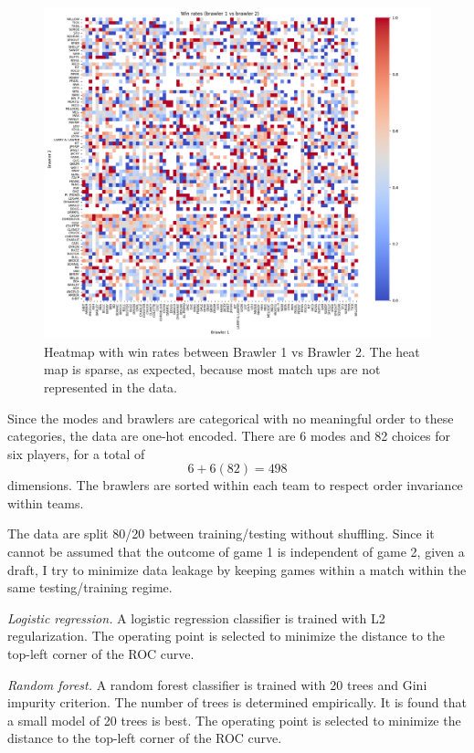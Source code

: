 \documentclass[11pt]{article}
\begin{document}
\begin{figure}[h!]
\centering
\includegraphics[width=6in]{../output/heatmap.png}
\caption{Heatmap with win rates between Brawler 1 vs Brawler 2. The heat map is sparse, as expected, because most match ups are not represented in the data.}
\label{fig:heatmap}
\end{figure}

Since the modes and brawlers are categorical with no meaningful order to these categories, the data are one-hot encoded. There are 6 modes and 82 choices for six players, for a total of 
$$6 + 6(82) = 498$$
dimensions. The brawlers are sorted within each team to respect order invariance within teams.

The data are split 80/20 between training/testing without shuffling. Since it cannot be assumed that the outcome of game 1 is independent of game 2, given a draft, I try to minimize data leakage by keeping games within a match within the same testing/training regime.

\textit{Logistic regression.} A logistic regression classifier is trained with L2 regularization. The operating point is selected to minimize the distance to the top-left corner of the ROC curve.

\textit{Random forest.} A random forest classifier is trained with 20 trees and Gini impurity criterion. The number of trees is determined empirically. It is found that a small model of 20 trees is best. The operating point is selected to minimize the distance to the top-left corner of the ROC curve.
\end{document}
